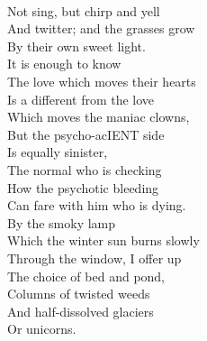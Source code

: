 \documentclass[smalldemyvopaper,11pt,twoside,onecolumn,openright,extrafontsizes]{memoir}
\begin{document}
\\Not sing, but chirp and yell
\\And twitter; and the grasses grow
\\By their own sweet light.
\\It is enough to know
\\The love which moves their hearts
\\Is a different from the love
\\Which moves the maniac clowns,
\\But the psycho-acIENT side
\\Is equally sinister,
\\The normal who is checking
\\How the psychotic bleeding
\\Can fare with him who is dying.
\\By the smoky lamp
\\Which the winter sun burns slowly
\\Through the window, I offer up
\\The choice of bed and pond,
\\Columns of twisted weeds
\\And half-dissolved glaciers
\\Or unicorns.
\end{document}
